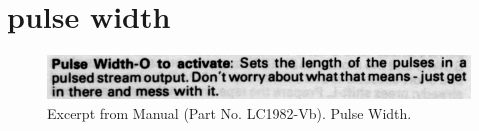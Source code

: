 \clearpage
\section*{pulse width} 
\label{sec:pulse_width}
\lstset{style=6502Style}

\begin{figure}[H]
    \centering
    \begin{adjustbox}{width=10.5cm,margin=0cm}
      \includegraphics[width=12cm]{src/pulsewidth/pulsewidth.png}%
    \end{adjustbox}
    \caption{
      Excerpt from Manual (Part No. LC1982-Vb). Pulse Width.
      }
\end{figure}


